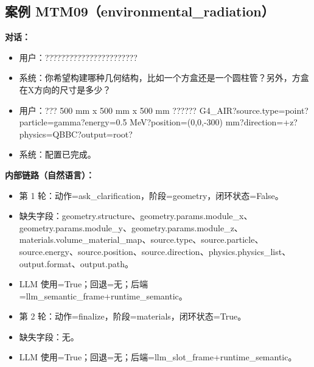 \documentclass[11pt]{ctexart}
\begin{document}
\subsection{案例 MTM09（environmental\_radiation）}
\textbf{对话：}
\begin{itemize}
\item 用户：???????????????????????
\item 系统：你希望构建哪种几何结构，比如一个方盒还是一个圆柱管？另外，方盒在X方向的尺寸是多少？
\item 用户：??? 500 mm x 500 mm x 500 mm ?????? G4\_AIR?source.type=point?particle=gamma?energy=0.5 MeV?position=(0,0,-300) mm?direction=+z?physics=QBBC?output=root?
\item 系统：配置已完成。
\end{itemize}
\textbf{内部链路（自然语言）：}
\begin{itemize}
\item 第 1 轮：动作=ask\_clarification，阶段=geometry，闭环状态=False。
\item 缺失字段：geometry.structure、geometry.params.module\_x、geometry.params.module\_y、geometry.params.module\_z、materials.volume\_material\_map、source.type、source.particle、source.energy、source.position、source.direction、physics.physics\_list、output.format、output.path。
\item LLM 使用=True；回退=无；后端=llm\_semantic\_frame+runtime\_semantic。
\item 第 2 轮：动作=finalize，阶段=materials，闭环状态=True。
\item 缺失字段：无。
\item LLM 使用=True；回退=无；后端=llm\_slot\_frame+runtime\_semantic。
\end{itemize}
\end{document}
